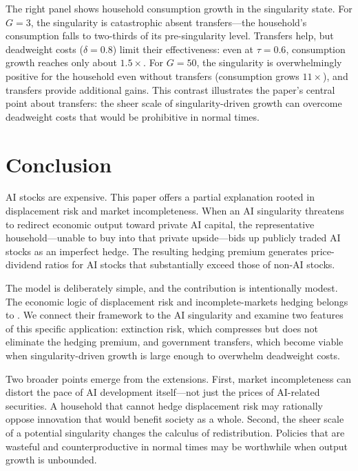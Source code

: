 \documentclass[12pt]{article}
\begin{document}
The right panel shows household consumption growth in the singularity state. For $G = 3$, the singularity is catastrophic absent transfers---the household's consumption falls to two-thirds of its pre-singularity level. Transfers help, but deadweight costs ($\delta = 0.8$) limit their effectiveness: even at $\tau = 0.6$, consumption growth reaches only about $1.5\times$. For $G = 50$, the singularity is overwhelmingly positive for the household even without transfers (consumption grows $11\times$), and transfers provide additional gains. This contrast illustrates the paper's central point about transfers: the sheer scale of singularity-driven growth can overcome deadweight costs that would be prohibitive in normal times.


\section{Conclusion}

AI stocks are expensive. This paper offers a partial explanation rooted in displacement risk and market incompleteness. When an AI singularity threatens to redirect economic output toward private AI capital, the representative household---unable to buy into that private upside---bids up publicly traded AI stocks as an imperfect hedge. The resulting hedging premium generates price-dividend ratios for AI stocks that substantially exceed those of non-AI stocks.

The model is deliberately simple, and the contribution is intentionally modest. The economic logic of displacement risk and incomplete-markets hedging belongs to \citet{GKP2012}. We connect their framework to the AI singularity and examine two features of this specific application: extinction risk, which compresses but does not eliminate the hedging premium, and government transfers, which become viable when singularity-driven growth is large enough to overwhelm deadweight costs.

Two broader points emerge from the extensions. First, market incompleteness can distort the pace of AI development itself---not just the prices of AI-related securities. A household that cannot hedge displacement risk may rationally oppose innovation that would benefit society as a whole. Second, the sheer scale of a potential singularity changes the calculus of redistribution. Policies that are wasteful and counterproductive in normal times may be worthwhile when output growth is unbounded.
\end{document}
